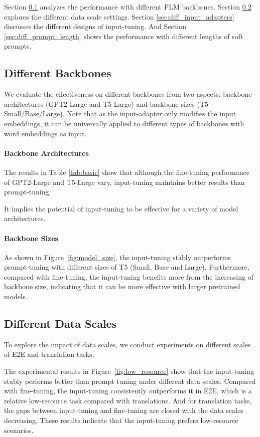 Section \ref{sec:diff_backbones} analyzes the performance with different PLM backbones. Section \ref{sec:low_resource} explores the different data scale settings. Section \ref{sec:diff_input_adapters} discusses the different designs of input-tuning. And Section \ref{sec:diff_prompt_length} shows the performance with different lengths of soft prompts.

\subsection{Different Backbones} \label{sec:diff_backbones}
We evaluate the effectiveness on different backbones from two aspects: backbone architectures (GPT2-Large and T5-Large) and backbone sizes (T5-Small/Base/Large). Note that as the input-adapter only modifies the input embeddings, it can be universally applied to different types of backbones with word embeddings as input.

\paragraph{Backbone Architectures} The results in Table \ref{tab:basic} show that although the fine-tuning performance of GPT2-Large and T5-Large vary, input-tuning maintains better results than prompt-tuning. 

It implies the potential of input-tuning to be effective for a variety of model architectures.

\paragraph{Backbone Sizes} As shown in Figure~\ref{fig:model_size}, the input-tuning stably outperforms prompt-tuning with different sizes of T5 (Small, Base and Large). Furthermore, compared with fine-tuning, the input-tuning benefits more from the increasing of backbone size, indicating that it can be more effective with larger pretrained models.

\subsection{Different Data Scales} \label{sec:low_resource}
To explore the impact of data scales, we conduct experiments on different scales of E2E and translation tasks.

The experimental results in Figure~\ref{fig:low_resource} show that the input-tuning stably performs better than prompt-tuning under different data scales. Compared with fine-tuning, the input-tuning consistently outperforms it in E2E, which is a relative low-resource task compared with translations. And for translation tasks, the gaps between input-tuning and fine-tuning are closed with the data scales decreasing. These results indicate that the input-tuning prefers low-resource scenarios.

